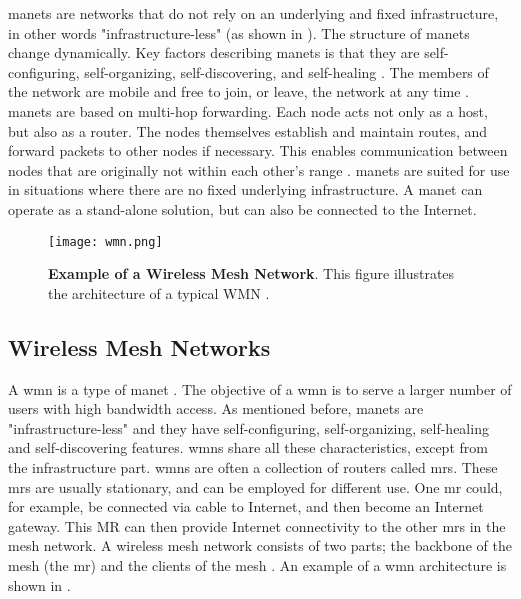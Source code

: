 \glspl{manet} are networks that do not rely on an underlying and fixed infrastructure, in other words "infrastructure-less" (as shown in ). The structure of \glspl{manet} change dynamically. Key factors describing \glspl{manet} is that they are self-configuring, self-organizing, self-discovering, and self-healing \cite{wmn}. The members of the network are mobile and free to join, or leave, the network at any time \cite{adhoc2}. \glspl{manet} are based on multi-hop forwarding. Each node acts not only as a host, but also as a router. The nodes themselves establish and maintain routes, and forward packets to other nodes if necessary. This enables communication between nodes that are originally not within each other's range \cite{adhoc2}. \glspl{manet} are suited for use in situations where there are no fixed underlying infrastructure. A \gls{manet} can operate as a stand-alone solution, but can also be connected to the Internet. 

\begin{figure}[t]
  \centering
    \texttt{[image: wmn.png]}
     \caption [Example of a Wireless Mesh Network]{\textbf{Example of a Wireless Mesh Network}. This figure illustrates the architecture of a typical WMN \cite{wmn}.}
\label{fig:wmn}
\end{figure}

\subsection{Wireless Mesh Networks}
\label{subsec:mesh}
A \gls{wmn} is a type of \gls{manet} \cite{wmn}. The objective of a \gls{wmn} is to serve a larger number of users with high bandwidth access. As mentioned before, \glspl{manet} are "infrastructure-less" and they have self-configuring, self-organizing, self-healing and self-discovering features. \glspl{wmn} share all these characteristics, except from the infrastructure part. \glspl{wmn} are often a collection of routers called \glspl{mr}. These \glspl{mr} are usually stationary, and can be employed for different use. One \gls{mr} could, for example, be connected via cable to Internet, and then become an Internet gateway. This MR can then provide Internet connectivity to the other \glspl{mr} in the mesh network. A wireless mesh network consists of two parts; the backbone of the mesh (the \gls{mr}) and the clients of the mesh \cite{wmn}. An example of a \gls{wmn} architecture is shown in . 


